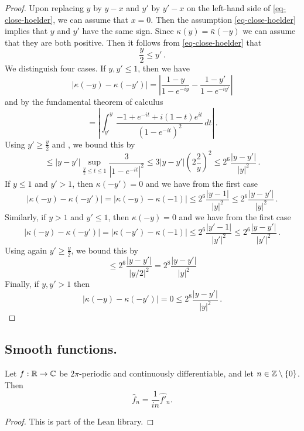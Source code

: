 \begin{proof}
\leanok
    Upon replacing $y$ by $y-x$ and $y'$ by $y'-x$ on the left-hand side of \eqref{eq-close-hoelder}, we can assume that $x = 0$. Then the assumption \eqref{eq-close-hoelder} implies that $y$ and $y'$ have the same sign. Since $\kappa(y) = \bar \kappa(-y)$ we can assume that they are both positive. Then it follows from \eqref{eq-close-hoelder} that
    $$
        \frac{y}{2} \le y' \,.
    $$
    We distinguish four cases. If $y, y' \le 1$, then we have
    $$
        |\kappa(-y) - \kappa(-y')| = \left| \frac{1 - y}{1- e^{-iy}} - \frac{1 - y'}{1- e^{-iy'}}\right|
    $$
    and by the fundamental theorem of calculus
    $$
        = \left| \int_{y'}^{y} \frac{-1 + e^{-it} + i(1-t)e^{it}}{(1 - e^{-it})^2} \,dt \right|\,.
    $$
    Using $y' \ge \frac{y}{2}$ and , we bound this by
    $$
        \le |y - y'| \sup_{\frac{y}{2} \le t \le 1} \frac{3}{|1 - e^{-it}|^2} \le 3 |y-y'| (2 \frac{2}{y})^2 \le 2^{6} \frac{|y-y'|}{|y|^2}\,.
    $$
    If $y \le 1$ and $y' > 1$, then $\kappa(-y') = 0$ and we have from the first case
    $$
        |\kappa(-y) - \kappa(-y')| = |\kappa(-y) - \kappa(-1)| \le 2^{6} \frac{|y-1|}{|y|^2} \le 2^{6} \frac{|y-y'|}{|y|^2}\,.
    $$
    Similarly, if $y > 1$ and $y' \le 1$, then $\kappa(-y) = 0$ and we have from the first case
    $$
        |\kappa(-y) - \kappa(-y')| = |\kappa(-y') - \kappa(-1)| \le 2^{6} \frac{|y'-1|}{|y'|^2} \le 2^{6} \frac{|y-y'|}{|y'|^2}\,.
    $$
    Using again $y' \ge \frac{y}{2}$, we bound this by
    $$
        \le 2^{6} \frac{|y-y'|}{|y / 2|^2} = 2^{8} \frac{|y-y'|}{|y|^2}
    $$
    Finally, if $y, y' > 1$ then
    $$
        |\kappa(-y) - \kappa(-y')| = 0 \le 2^{8} \frac{|y-y'|}{|y|^2}\,.
    $$
\end{proof}






\subsection{Smooth functions.}
\label{10smooth}
\begin{lemma}
\label{fourier-coeff-derivative}
\leanok
{}
Let $f:{\mathbb{R}} \to \mathbb{C}$ be $2\pi$-periodic and continuously differentiable, and let $n \in {\mathbb{Z}} \setminus \{0\}$. Then
\begin{equation}
    \widehat{f}_n = \frac{1}{i n} \widehat{f'}_n.
\end{equation}
\end{lemma}
\begin{proof}
\leanok
This is part of the Lean library.
\end{proof}

